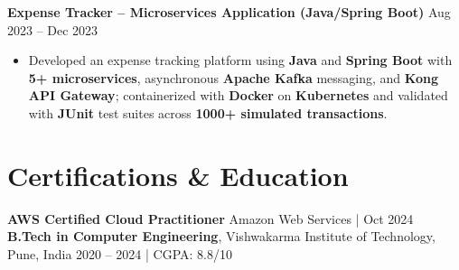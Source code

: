 \documentclass[a4paper,10pt]{article}
\begin{document}
\textbf{Expense Tracker -- Microservices Application (Java/Spring Boot)} \hfill Aug 2023 -- Dec 2023
\begin{itemize}[leftmargin=*]
    \item Developed an expense tracking platform using \textbf{Java} and \textbf{Spring Boot} with \textbf{5+ microservices}, asynchronous \textbf{Apache Kafka} messaging, and \textbf{Kong API Gateway}; containerized with \textbf{Docker} on \textbf{Kubernetes} and validated with \textbf{JUnit} test suites across \textbf{1000+ simulated transactions}.
\end{itemize}

\section*{Certifications \& Education}
\textbf{AWS Certified Cloud Practitioner} \hfill Amazon Web Services \;|\; Oct 2024 \\
\textbf{B.Tech in Computer Engineering}, Vishwakarma Institute of Technology, Pune, India \hfill 2020 -- 2024 \;|\; CGPA: 8.8/10
\end{document}
